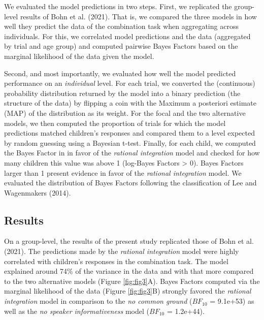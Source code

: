 \documentclass[
  man,floatsintext]{apa6}
\begin{document}
We evaluated the model predictions in two steps. First, we replicated the group-level results of Bohn et al. (2021). That is, we compared the three models in how well they predict the data of the combination task when aggregating across individuals. For this, we correlated model predictions and the data (aggregated by trial and age group) and computed pairwise Bayes Factors based on the marginal likelihood of the data given the model.

Second, and most importantly, we evaluated how well the model predicted performance on an \emph{individual} level. For each trial, we converted the (continuous) probability distribution returned by the model into a binary prediction (the structure of the data) by flipping a coin with the Maximum a posteriori estimate (MAP) of the distribution as its weight. For the focal and the two alternative models, we then computed the proportion of trials for which the model predictions matched children's responses and compared them to a level expected by random guessing using a Bayesian t-test. Finally, for each child, we computed the Bayes Factor in in favor of the \emph{rational integration} model and checked for how many children this value was above 1 (log-Bayes Factors \textgreater{} 0). Bayes Factors larger than 1 present evidence in favor of the \emph{rational integration} model. We evaluated the distribution of Bayes Factors following the classification of Lee and Wagenmakers (2014).

\hypertarget{results-1}{%
\subsection{Results}\label{results-1}}

On a group-level, the results of the present study replicated those of Bohn et al. (2021). The predictions made by the \emph{rational integration} model were highly correlated with children's responses in the combination task. The model explained around 74\% of the variance in the data and with that more compared to the two alternative models (Figure \ref{fig:fig3}A). Bayes Factors computed via the marginal likelihood of the data (Figure \ref{fig:fig3}B) strongly favored the \emph{rational integration} model in comparison to the \emph{no common ground} (\(BF_{10}\) = 9.1e+53) as well as the \emph{no speaker informativeness} model (\(BF_{10}\) = 1.2e+44).
\end{document}

